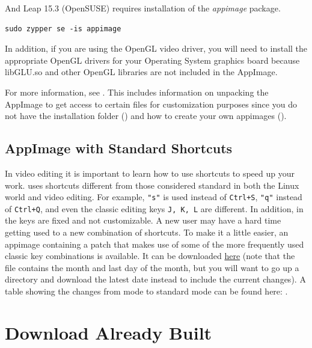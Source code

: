 And Leap 15.3 (OpenSUSE) requires installation of the \textit{appimage} package.

\begin{lstlisting}[style=sh]
	sudo zypper se -is appimage
\end{lstlisting}

In addition, if you are using the OpenGL video driver, you will need to install the appropriate OpenGL
drivers for your Operating System graphics board because libGLU.so and other OpenGL libraries are
not included in the AppImage.

For more information, see . This includes
information on unpacking the AppImage to get access to certain files for customization
purposes since you do not have the installation folder ()
and how to create your own appimages ().

\subsection{AppImage with Standard Shortcuts}
\label{sec:appimage_standard_shortcuts}

In video editing it is important to learn how to use shortcuts to speed up your work. \CGG{} uses shortcuts different from those considered standard in both the Linux world and video editing. For example, \texttt{"s"} is used instead of \texttt{Ctrl+S}, \texttt{"q"} instead of \texttt{Ctrl+Q}, and even the classic editing keys \texttt{J, K, L} are different.
In addition, in \CGG{} the keys are fixed and not customizable. A new user may have a hard time getting used to a new combination of shortcuts. To make it a little easier, an appimage containing a patch that makes use of some of the more frequently used classic key combinations is available. It can be downloaded \href{https://download.cinelerra-gg.org/download.php?file=images\%2F/CinGG-20251231-alternative_shortcuts.AppImage}{here} (note that the file contains the month and last day of the month, but you will want to go up a directory and download the latest date instead to include the current changes). A table showing the changes from \CGG{} mode to standard mode can be found here: .

\section{Download Already Built \CGG{}}%
\label{sec:download_already_built_cinelerra_gg}

